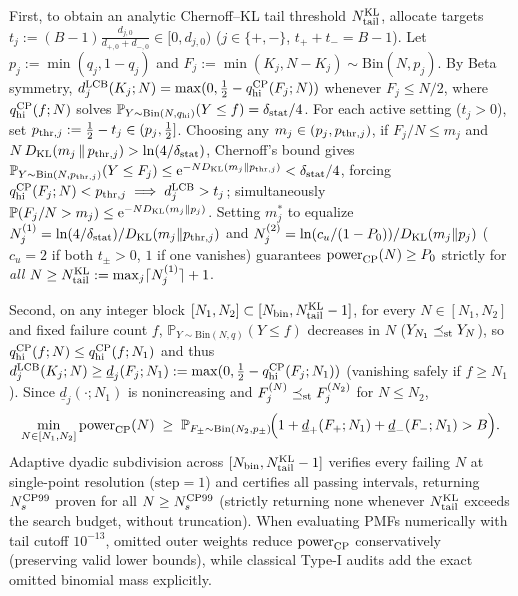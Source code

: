 \documentclass{iopjournal}
\newcommand{\ee}{\mathrm{e}}
\begin{document}
First, to obtain an analytic Chernoff--KL tail threshold $N_{\rm tail}^{\rm KL}$, allocate targets $t_j := (B - 1)\frac{d_{j,0}}{d_{+,0}+d_{-,0}} \in [0, d_{j,0})$ ($j\in\{+,-\}$, $t_+ + t_- = B - 1$). Let $p_j := \min(q_j, 1-q_j)$ and $F_j := \min(K_j, N - K_j) \sim \mathrm{Bin}(N, p_j)$. By Beta symmetry, $d_j^{\rm LCB}(K_j;N) = \max(0, \frac{1}{2} - q_{\rm hi}^{\rm CP}(F_j;N))$ whenever $F_j \le N/2$, where $q_{\rm hi}^{\rm CP}(f;N)$ solves $\mathbb{P}_{Y\sim\mathrm{Bin}(N,q_{\rm hi})}(Y \le f) = \delta_{\rm stat}/4$. For each active setting ($t_j > 0$), set $p_{{\rm thr},j} := \frac{1}{2} - t_j \in (p_j, \frac{1}{2}]$. Choosing any $m_j \in (p_j, p_{{\rm thr},j})$, if $F_j/N \le m_j$ and $N\,D_{\rm KL}(m_j \,\|\, p_{{\rm thr},j}) > \ln(4/\delta_{\rm stat})$, Chernoff's bound gives $\mathbb{P}_{Y\sim\mathrm{Bin}(N,p_{{\rm thr},j})}(Y \le F_j) \le \ee^{-N D_{\rm KL}(m_j \| p_{{\rm thr},j})} < \delta_{\rm stat}/4$, forcing $q_{\rm hi}^{\rm CP}(F_j;N) < p_{{\rm thr},j} \implies d_j^{\rm LCB} > t_j$; simultaneously $\mathbb{P}(F_j/N > m_j) \le \ee^{-N D_{\rm KL}(m_j \| p_j)}$. Setting $m_j^*$ to equalize $N_j^{(1)} = \ln(4/\delta_{\rm stat})/D_{\rm KL}(m_j \| p_{{\rm thr},j})$ and $N_j^{(2)} = \ln(c_u/(1-P_0))/D_{\rm KL}(m_j \| p_j)$ ($c_u = 2$ if both $t_\pm > 0$, $1$ if one vanishes) guarantees $\operatorname{power}_{\rm CP}(N) \ge P_0$ strictly for \emph{all} $N \ge N_{\rm tail}^{\rm KL} := \max_j \lceil N_j^{(1)} \rceil + 1$.

Second, on any integer block $[N_1, N_2] \subset [N_{\rm bin}, N_{\rm tail}^{\rm KL} - 1]$, for every $N \in [N_1, N_2]$ and fixed failure count $f$, $\mathbb{P}_{Y\sim\mathrm{Bin}(N,q)}(Y \le f)$ decreases in $N$ ($Y_{N_1} \preceq_{\rm st} Y_N$), so $q_{\rm hi}^{\rm CP}(f;N) \le q_{\rm hi}^{\rm CP}(f;N_1)$ and thus $d_j^{\rm LCB}(K_j;N) \ge \underline{d}_j(F_j; N_1) := \max(0, \frac{1}{2} - q_{\rm hi}^{\rm CP}(F_j;N_1))$ (vanishing safely if $f \ge N_1$). Since $\underline{d}_j(\cdot;N_1)$ is nonincreasing and $F_j^{(N)} \preceq_{\rm st} F_j^{(N_2)}$ for $N \le N_2$,
\begin{equation*}
\min_{N \in [N_1, N_2]} \operatorname{power}_{\rm CP}(N) \;\ge\; \mathbb{P}_{F_\pm \sim \mathrm{Bin}(N_2, p_\pm)}\!\Bigl(1 + \underline{d}_+(F_+; N_1) + \underline{d}_-(F_-; N_1) > B\Bigr).
\end{equation*}
Adaptive dyadic subdivision across $[N_{\rm bin}, N_{\rm tail}^{\rm KL} - 1]$ verifies every failing $N$ at single-point resolution ($\text{step}=1$) and certifies all passing intervals, returning $N_s^{\rm CP99}$ proven for all $N \ge N_s^{\rm CP99}$ (strictly returning none whenever $N_{\rm tail}^{\rm KL}$ exceeds the search budget, without truncation). When evaluating PMFs numerically with tail cutoff $10^{-13}$, omitted outer weights reduce $\operatorname{power}_{\rm CP}$ conservatively (preserving valid lower bounds), while classical Type-I audits add the exact omitted binomial mass explicitly.
\end{document}
